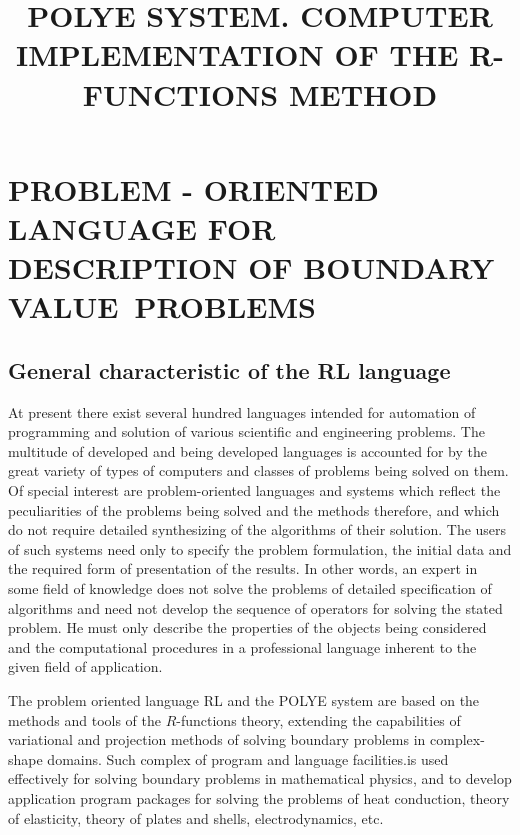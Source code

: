 
\author{}
\title{POLYE SYSTEM. COMPUTER IMPLEMENTATION OF THE R-FUNCTIONS METHOD
}





\maketitle
\tableofcontents
\listoftables
\chapter{ PROBLEM - ORIENTED LANGUAGE FOR DESCRIPTION OF BOUNDARY VALUE\
PROBLEMS}

\section{ General characteristic of the RL language}

At present there exist several hundred languages intended for automation of
programming and solution of various scientific and engineering problems. The
multitude of developed and being developed languages is accounted for by the
great variety of types of computers and classes of problems being solved on
them. Of special interest are problem-oriented languages and systems which
reflect the peculiarities of the problems being solved and the methods
therefore, and which do not require detailed synthesizing of the algorithms
of their solution. The users of such systems need only to specify the
problem formulation, the initial data and the required form of presentation
of the results. In other words, an expert in some field of knowledge does
not solve the problems of detailed specification of algorithms and need not
develop the sequence of operators for solving the stated problem. He must
only describe the properties of the objects being considered and the
computational procedures in a professional language inherent to the given
field of application.

The problem oriented language RL and the POLYE system are based on the
methods and tools of the $R$-functions theory, extending the capabilities of
variational and projection methods of solving boundary problems in
complex-shape domains. Such complex of program and language facilities.is
used effectively for solving boundary problems in mathematical physics, and
to develop application program packages for solving the problems of heat
conduction, theory of elasticity, theory of plates and shells,
electrodynamics, etc.

